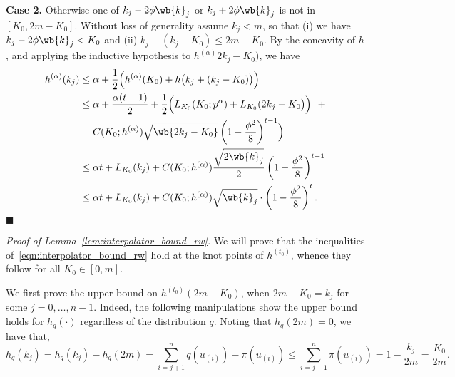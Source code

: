 \documentclass[twoside,11pt]{article}
\newcommand{\1}{\mathbf{1}}
\newcommand{\qed}{\hfill $\blacksquare$}
\begin{document}
\textbf{Case 2.} Otherwise one of $k_j - 2 \phi \wb{k}_j$ or $k_j + 2 \phi \wb{k}_j$ is not in $[K_0,2m  - K_0]$. Without loss of generality assume $k_j < m$, so that (i) we have $k_j - 2 \phi \wb{k}_j < K_0$ and (ii) $k_j + (k_j - K_0) \leq 2m - K_0$. By the concavity of $h$, and applying the inductive hypothesis to $h^{(\alpha)}2k_j - K_0)$, we have
\begin{align*}
h^{(\alpha)}(k_j) & \leq \alpha + \frac{1}{2}\Bigl(h^{(\alpha)}(K_0) + h\bigl(k_j + (k_j - K_0)\bigr)\Bigr) \\
& \leq\alpha + \frac{\alpha(t - 1)}{2} + \frac{1}{2}\Bigl(L_{K_0}(K_0;p^{\alpha}) + L_{K_0}(2k_j - K_0\bigr)\Bigr) ~~+ \\
& \quad~ C(K_0;h^{(\alpha)})\sqrt{\wb{2k_j - K_0}}\left(1 - \frac{\phi^2}{8}\right)^{t - 1}\Bigr) \\
& \leq \alpha t + L_{K_0}(k_j) + C(K_0;h^{(\alpha)}) \frac{\sqrt{2\wb{k}_j}}{2} \left(1 - \frac{\phi^2}{8}\right)^{t - 1} \\
& \leq \alpha t + L_{K_0}(k_j) + C(K_0;h^{(\alpha)}) \sqrt{\wb{k}_j} \cdot \left(1 - \frac{\phi^2}{8}\right)^{t}.
\end{align*} \qed

\noindent \emph{Proof of Lemma~\ref{lem:interpolator_bound_rw}.}
We will prove that the inequalities of~\eqref{eqn:interpolator_bound_rw} hold at the knot points of $h^{(t_0)}$, whence they follow for all $K_0 \in [0,m]$. 

We first prove the upper bound on $h^{(t_0)}(2m - K_0)$, when $2m - K_0 = k_j$ for some $j = 0,\ldots,n - 1$. Indeed, the following manipulations show the upper bound holds for $h_q(\cdot)$ regardless of the distribution $q$. Noting that $h_q(2m) = 0$, we have that,
\begin{equation*}
h_q(k_j) = h_q(k_j) - h_q(2m) = \sum_{i = j + 1}^{n} q(u_{(i)}) - \pi(u_{(i)}) \leq \sum_{i = j + 1}^{n} \pi(u_{(i)}) = 1 - \frac{k_j}{2m} = \frac{K_0}{2m}.
\end{equation*}
\end{document}
